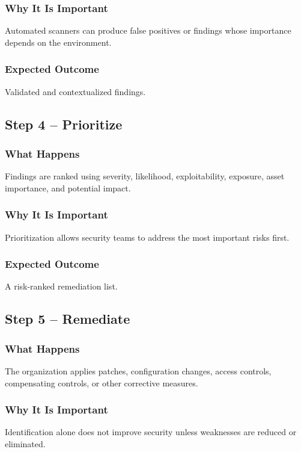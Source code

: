 \documentclass[11pt,a4paper]{article}
\begin{document}
\subsubsection{Why It Is Important}
Automated scanners can produce false positives or findings whose importance depends on the environment.

\subsubsection{Expected Outcome}
Validated and contextualized findings.

\subsection{Step 4 – Prioritize}
\subsubsection{What Happens}
Findings are ranked using severity, likelihood, exploitability, exposure, asset importance, and potential impact.

\subsubsection{Why It Is Important}
Prioritization allows security teams to address the most important risks first.

\subsubsection{Expected Outcome}
A risk-ranked remediation list.

\subsection{Step 5 – Remediate}
\subsubsection{What Happens}
The organization applies patches, configuration changes, access controls, compensating controls, or other corrective measures.

\subsubsection{Why It Is Important}
Identification alone does not improve security unless weaknesses are reduced or eliminated.
\end{document}
